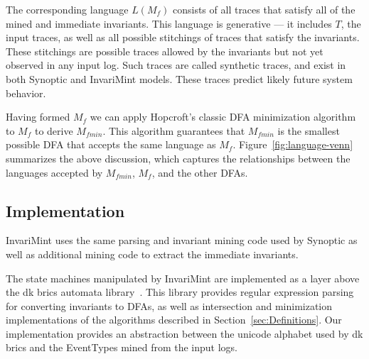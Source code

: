 The corresponding language
$L(M_f)$ consists of all traces that
satisfy all of the mined and immediate invariants.  This language is generative
--- it includes $T$, the input traces, as well as all possible
stitchings of traces that satisfy the invariants. These stitchings are
possible traces allowed by the invariants but not yet observed in any input log.
Such traces are called synthetic traces, and exist in both Synoptic and
InvariMint models. These traces predict likely
future system behavior.

Having formed $M_f$ we can apply Hopcroft's classic DFA minimization
algorithm to $M_f$ to derive
$M_{f min}$. This algorithm guarantees that $M_{f min}$ is the smallest possible
DFA that accepts the same language as $M_f$. Figure~\ref{fig:language-venn}
summarizes the above discussion, which captures the
relationships between the languages accepted by $M_{f min}$,
$M_f$, and the other DFAs.

\subsection{Implementation}
\label{sec:implementation}

InvariMint uses the same parsing and invariant mining code used by Synoptic as
well as additional mining code to extract the immediate invariants.

The state machines manipulated by InvariMint are implemented as a layer above
the dk brics automata library~\cite{automaton}. This library provides regular expression parsing for
converting invariants to DFAs, as well as intersection and minimization
implementations of the algorithms described in Section~\ref{sec:Definitions}.
Our implementation provides an abstraction between the unicode alphabet
used by dk brics and the EventTypes mined from the input logs.
